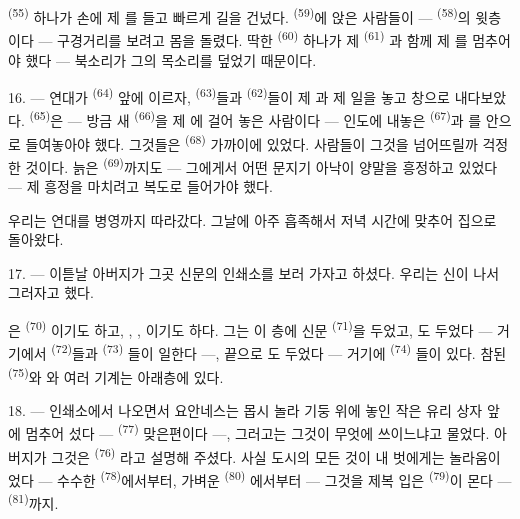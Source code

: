  \textsuperscript{(55)} 하나가 손에 제 를 들고
빠르게 길을 건넜다.  \textsuperscript{(59)}에 앉은 사람들이 —
 \textsuperscript{(58)}의 윗층이다 — 구경거리를 보려고 몸을 돌렸다. 딱한
 \textsuperscript{(60)} 하나가 제  \textsuperscript{(61)}
과 함께 제 를 멈추어야 했다 — 북소리가 그의 목소리를 덮었기 때문이다.

16. --- 연대가  \textsuperscript{(64)} 앞에 이르자,  \textsuperscript{(63)}들과  \textsuperscript{(62)}들이 제
과 제 일을 놓고 창으로 내다보았다.  \textsuperscript{(65)}은
— 방금 새  \textsuperscript{(66)}을 제 에 걸어 놓은 사람이다 —
인도에 내놓은  \textsuperscript{(67)}과 를 안으로 들여놓아야
했다. 그것들은  \textsuperscript{(68)} 가까이에 있었다. 사람들이 그것을
넘어뜨릴까 걱정한 것이다. 늙은  \textsuperscript{(69)}까지도 — 그에게서
어떤 문지기 아낙이 양말을 흥정하고 있었다 — 제 흥정을 마치려고 복도로 들어가야 했다.

우리는 연대를 병영까지 따라갔다. 그날에 아주 흡족해서 저녁 시간에 맞추어 집으로 돌아왔다.

\VUsaut{3.0mm}

17. --- 이튿날 아버지가 그곳 신문의 인쇄소를 보러 가자고 하셨다. 우리는 신이 나서
그러자고 했다.

은  \textsuperscript{(70)} 이기도
하고, , , 이기도 하다. 그는
이 층에 신문  \textsuperscript{(71)}을 두었고, 도 두었다 —
거기에서  \textsuperscript{(72)}들과  \textsuperscript{(73)}
들이 일한다 —, 끝으로 도 두었다 — 거기에  \textsuperscript{(74)}
들이 있다. 참된  \textsuperscript{(75)}와 와 여러 기계는
아래층에 있다.

\VUsaut{3.0mm}

18. --- 인쇄소에서 나오면서 요안네스는 몹시 놀라 기둥 위에 놓인 작은 유리 상자 앞에
멈추어 섰다 —  \textsuperscript{(77)} 맞은편이다 —, 그러고는 그것이
무엇에 쓰이느냐고 물었다. 아버지가 그것은  \textsuperscript{(76)}
라고 설명해 주셨다. 사실 도시의 모든 것이 내 벗에게는 놀라움이었다 — 수수한
 \textsuperscript{(78)}에서부터, 가벼운  \textsuperscript{(80)}
에서부터 — 그것을 제복 입은  \textsuperscript{(79)}이 몬다 —
 \textsuperscript{(81)}까지.

